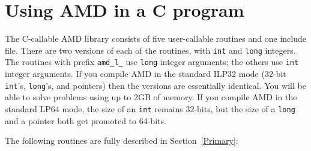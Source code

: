 \documentclass[11pt]{article}
\begin{document}
\section{Using AMD in a C program}
\label{Cversion}

The C-callable AMD library consists of five user-callable routines and one
include file.  There are two versions of each of the routines, with
{\tt int} and {\tt long} integers.
The routines with prefix
{\tt amd\_l\_} use {\tt long} integer arguments; the others use
{\tt int} integer arguments.  If you compile AMD in the standard
ILP32 mode (32-bit {\tt int}'s, {\tt long}'s, and pointers) then the versions
are essentially identical.  You will be able to solve problems using up to 2GB
of memory.  If you compile AMD in the standard LP64 mode, the size of an
{\tt int} remains 32-bits, but the size of a {\tt long} and a pointer both get
promoted to 64-bits.

The following routines are fully described in Section~\ref{Primary}:
\end{document}
